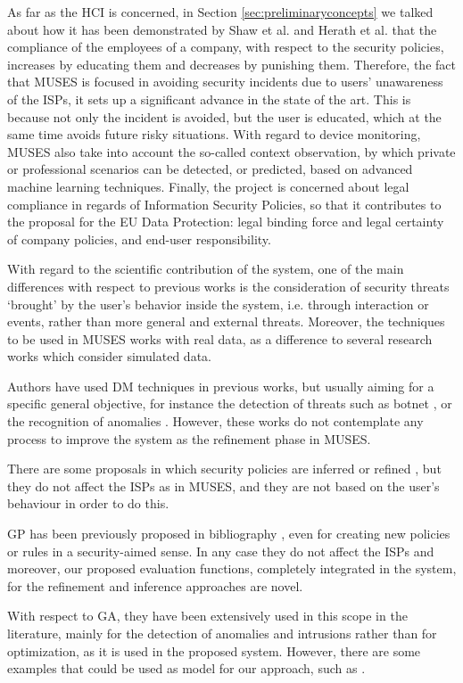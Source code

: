 As far as the HCI is concerned, in Section \ref{sec:preliminaryconcepts} we talked about how it has been demonstrated by Shaw et al. \cite{SecPolComp09} and Herath et al. \cite{SecPolPenalty09} that the compliance of the employees of a company, with respect to the security policies, increases by educating them and decreases by punishing them. Therefore, the fact that MUSES is focused in avoiding security incidents due to users' unawareness of the ISPs, it sets up a significant advance in the state of the art. This is because not only the incident is avoided, but the user is educated, which at the same time avoids future risky situations.
With regard to device monitoring, MUSES  also take into account the so-called context observation, by which private or professional scenarios can be detected, or predicted, based on advanced machine learning techniques. Finally, the project is concerned about legal compliance in regards of Information Security Policies, so that it  contributes to the proposal for the EU Data Protection: legal binding force and legal certainty of company policies, and end-user responsibility.

With regard to the scientific contribution of the system, one of the main differences with respect to previous works is the consideration of security threats `brought' by the user's behavior inside the system, i.e. through interaction or events, rather than more general and external threats. Moreover, the techniques to be used in MUSES  works with real data, as a difference to several research works which consider simulated data.

Authors have used DM techniques in previous works, but usually aiming for a specific general objective, for instance the detection of threats such as botnet \cite{botnet_detection_clustering_09}, or the recognition of anomalies \cite{feature_selection_anomalies_08}. However, these works do not contemplate any process to improve the system as the refinement phase in MUSES.

There are some proposals in which security policies are inferred or refined \cite{inferring_policies_socialnetworks_09,policy_generation_clustering_10}, but they do not affect the ISPs as in MUSES, and they are not based on the user's behaviour in order to do this.

GP has been previously proposed in bibliography \cite{rule_generation_gp_09,sec_policy_evolution_gp_08}, even for creating new policies or rules in a security-aimed sense. In any case they do not affect the ISPs and moreover, our proposed evaluation functions, completely integrated in the system, for the refinement and inference approaches are novel.

With respect to GA, they have been extensively used in this scope in the literature, mainly for the detection of anomalies and intrusions rather than for optimization, as it is used in the proposed system. However, there are some examples that could be used as model for our approach, such as \cite{EAs_securitycosts-kirta,risk_reduction_ga_12}.
